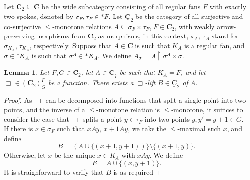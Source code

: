 \documentclass[12pt]{amsart}
\numberwithin{equation}{section}
\theoremstyle{plain}
\newtheorem{lemma}[theorem]{Lemma}
\newtheorem{remark}[theorem]{\bf Remark}
\theoremstyle{definition}
\newcommand \sqsp{\sqsupset}
\newcommand \uhr{\upharpoonright}
\newcommand \CCb{\mathbf{C}}
\newcommand \IIb{\mathbf{I}}
\newcommand \CCub{\underline{\mathbf{C}}}
\newcommand \DDub{\underline{\mathbf{D}}}
\newcommand \IIub{\underline{\mathbf{I}}}
\newcommand \JJub{\underline{\mathbf{J}}}
\begin{document}
Let $\CCb_2 \subseteq \CCb$ be the wide subcategory consisting of all regular fans $F$ with exactly two spokes, denoted by $\sigma_F, \tau_F \in *F$. Let $\CCub_2$ be the category of all surjective and co-surjective $\leq$-monotone relations $A \subseteq \sigma_F \times \tau_F$, $F \in \CCb_2$, with weakly arrow-preserving morphisms from $\CCb_2$ as morphisms;  in this context, $\sigma_A$, $\tau_A$ stand for $\sigma_{K_A}$, $\tau_{K_A}$, respectively.  Suppose that $A \in \CCub$ is such that $K_A$ is a regular fan, and $\sigma \in *K_A$ is such that $\sigma^A \in *K_A$. We define $A_{\sigma}=A \uhr \sigma^A \times \sigma$.%



\begin{lemma}
	\label{le:C2Lift}
	Let $F,G \in \CCb_2$,  let $A \in \CCub_2$ be such that $K_A=F$, and let $\sqsp \in (\CCb_2)^F_G$ be a function. There exists a $\sqsp$-lift $B \in \CCub_2$ of $A$. %
\end{lemma}

\begin{proof}
	As $\sqsp$ can be decomposed into functions that split a single point into two points, and the inverse of a $\leq$-monotone relation is $\leq$-monotone, it suffices to consider the case that $\sqsp$ splits a point $y \in \tau_F$ into two points $y, y'=y+1 \in G$. If there is $x \in \sigma_F$ such that $x A y$, $x+1 A y$, we take the $\leq$-maximal such $x$, and define $$B=(A \cup \{ (x+1,y+1)) \} \setminus \{(x+1,y)\}.$$ Otherwise, let $x$ be the unique $x \in K_A$ with $x A y$. We define $$B=A \cup \{ (x,y+1) \}.$$  
It is straighforward to verify that $B$ is as required.
\end{proof}
\end{document}
